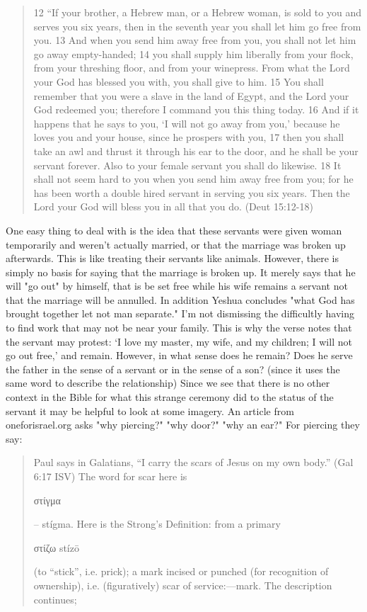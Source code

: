 \documentclass[11pt]{article}
\begin{document}
\begin{quote}
12 “If your brother, a Hebrew man, or a Hebrew woman, is sold to you and serves you six years, then in the seventh year you shall let him go free from you. 13 And when you send him away free from you, you shall not let him go away empty-handed; 14 you shall supply him liberally from your flock, from your threshing floor, and from your winepress. From what the Lord your God has blessed you with, you shall give to him. 15 You shall remember that you were a slave in the land of Egypt, and the Lord your God redeemed you; therefore I command you this thing today. 16 And if it happens that he says to you, ‘I will not go away from you,’ because he loves you and your house, since he prospers with you, 17 then you shall take an awl and thrust it through his ear to the door, and he shall be your servant forever. Also to your female servant you shall do likewise. 18 It shall not seem hard to you when you send him away free from you; for he has been worth a double hired servant in serving you six years. Then the Lord your God will bless you in all that you do. (Deut 15:12-18)
\end{quote}


One easy thing to deal with is the idea that these servants were given woman temporarily and weren't actually married, or that the marriage was broken up afterwards. This is like treating their servants like animals. However, there is simply no basis for saying that the marriage is broken up. It merely says that he will "go out" by himself, that is be set free while his wife remains a servant not that the marriage will be annulled. In addition Yeshua concludes "what God has brought together let not man separate." I'm not dismissing the difficultly having to find work that may not be near your family. This is why the verse notes that the servant may protest: ‘I love my master, my wife, and my children; I will not go out free,’ and remain. However, in what sense does he remain? Does he serve the father in the sense of a servant or in the sense of a son? (since it uses the same word to describe the relationship) Since we see that there is no other context in the Bible for what this strange ceremony did to the status of the servant it may be helpful to look at some imagery. An article from oneforisrael.org asks "why piercing?" "why door?" "why an ear?"
For piercing they say:
\begin{quote}
Paul says in Galatians, “I carry the scars of Jesus on my own body.” (Gal 6:17 ISV) The word for scar here is \begin{greek} στίγμα \end{greek} – stígma. Here is the Strong’s Definition: from a primary \begin{greek} στίζω stízō \end{greek} (to “stick”, i.e. prick); a mark incised or punched (for recognition of ownership), i.e. (figuratively) scar of service:—mark. The description continues;\end{quote}
\end{document}
